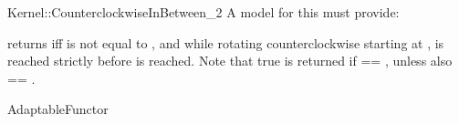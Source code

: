 \begin{ccRefFunctionObjectConcept}{Kernel::CounterclockwiseInBetween_2}
A model for this must provide:


{returns  iff  is not equal to , and 
        while rotating counterclockwise starting at , 
         is reached strictly before  is reached.
        Note that true is returned if  == , unless
        also  == .}

\ccRefines
AdaptableFunctor

\ccSeeAlso
{}\\

\end{ccRefFunctionObjectConcept}
